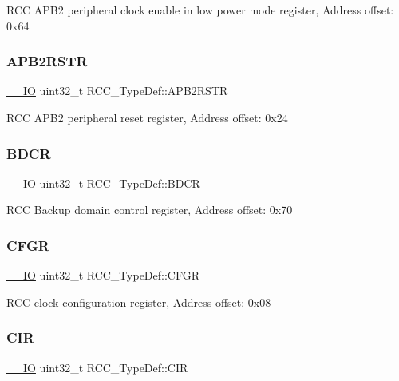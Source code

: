 R\+CC A\+P\+B2 peripheral clock enable in low power mode register, Address offset\+: 0x64 \mbox{\label{struct_r_c_c___type_def_a4491ab20a44b70bf7abd247791676a59}} 
\subsubsection{\texorpdfstring{APB2RSTR}{APB2RSTR}}
{\footnotesize\ttfamily \mbox{\hyperlink{core__sc300_8h_aec43007d9998a0a0e01faede4133d6be}{\+\_\+\+\_\+\+IO}} uint32\+\_\+t R\+C\+C\+\_\+\+Type\+Def\+::\+A\+P\+B2\+R\+S\+TR}

R\+CC A\+P\+B2 peripheral reset register, Address offset\+: 0x24 \mbox{\label{struct_r_c_c___type_def_a05be375db50e8c9dd24fb3bcf42d7cf1}} 
\subsubsection{\texorpdfstring{BDCR}{BDCR}}
{\footnotesize\ttfamily \mbox{\hyperlink{core__sc300_8h_aec43007d9998a0a0e01faede4133d6be}{\+\_\+\+\_\+\+IO}} uint32\+\_\+t R\+C\+C\+\_\+\+Type\+Def\+::\+B\+D\+CR}

R\+CC Backup domain control register, Address offset\+: 0x70 \mbox{\label{struct_r_c_c___type_def_a0721b1b729c313211126709559fad371}} 
\subsubsection{\texorpdfstring{CFGR}{CFGR}}
{\footnotesize\ttfamily \mbox{\hyperlink{core__sc300_8h_aec43007d9998a0a0e01faede4133d6be}{\+\_\+\+\_\+\+IO}} uint32\+\_\+t R\+C\+C\+\_\+\+Type\+Def\+::\+C\+F\+GR}

R\+CC clock configuration register, Address offset\+: 0x08 \mbox{\label{struct_r_c_c___type_def_aeadf3a69dd5795db4638f71938704ff0}} 
\subsubsection{\texorpdfstring{CIR}{CIR}}
{\footnotesize\ttfamily \mbox{\hyperlink{core__sc300_8h_aec43007d9998a0a0e01faede4133d6be}{\+\_\+\+\_\+\+IO}} uint32\+\_\+t R\+C\+C\+\_\+\+Type\+Def\+::\+C\+IR}

